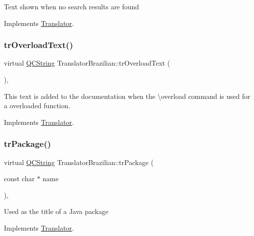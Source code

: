 Text shown when no search results are found 

Implements \mbox{\hyperlink{class_translator}{Translator}}.

\mbox{\label{class_translator_brazilian_ad554941ca833612bcb230f768c96ed01}} 
\subsubsection{\texorpdfstring{trOverloadText()}{trOverloadText()}}
{\footnotesize\ttfamily virtual \mbox{\hyperlink{class_q_c_string}{Q\+C\+String}} Translator\+Brazilian\+::tr\+Overload\+Text (\begin{DoxyParamCaption}{ }\end{DoxyParamCaption})\hspace{0.3cm}{\ttfamily [inline]}, {\ttfamily [virtual]}}

This text is added to the documentation when the \textbackslash{}overload command is used for a overloaded function. 

Implements \mbox{\hyperlink{class_translator}{Translator}}.

\mbox{\label{class_translator_brazilian_a4ba6eece2465e15cfe6dde5fe2ea74f5}} 
\subsubsection{\texorpdfstring{trPackage()}{trPackage()}}
{\footnotesize\ttfamily virtual \mbox{\hyperlink{class_q_c_string}{Q\+C\+String}} Translator\+Brazilian\+::tr\+Package (\begin{DoxyParamCaption}\item[{const char $\ast$}]{name }\end{DoxyParamCaption})\hspace{0.3cm}{\ttfamily [inline]}, {\ttfamily [virtual]}}

Used as the title of a Java package 

Implements \mbox{\hyperlink{class_translator}{Translator}}.

\mbox{\label{class_translator_brazilian_ad44d750aa928ac203ac1b3615b02aa95}} 
